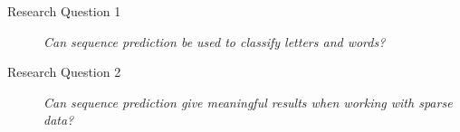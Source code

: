 
\begin{description}
    \item[Research Question 1]{\textit{Can sequence prediction be used to classify letters and words?}}
    \item[Research Question 2]{\textit{Can sequence prediction give meaningful results when working with sparse data?}}
\end{description}